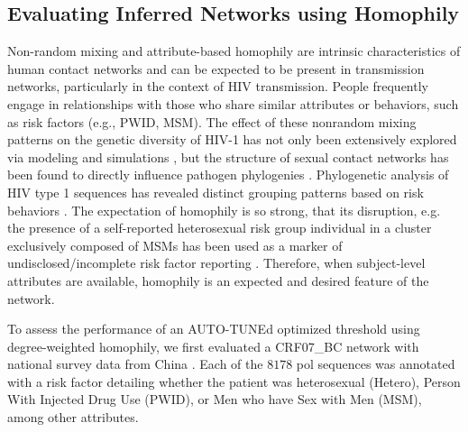 \documentclass[utf8]{FrontiersinHarvard} %
\begin{document}

\subsection{Evaluating Inferred Networks using Homophily}

Non-random mixing and attribute-based homophily are intrinsic characteristics
of human contact networks and can be expected to be present in transmission
networks, particularly in the context of HIV transmission. People frequently
engage in relationships with those who share similar attributes or behaviors,
such as risk factors (e.g., PWID, MSM). The effect of these nonrandom mixing
patterns on the genetic diversity of HIV-1 has not only been extensively
explored via modeling and simulations \citep{goodreau_assessing_2006}, but the
structure of sexual contact networks has been found to directly influence
pathogen phylogenies \citep{robinson_how_2013}. Phylogenetic analysis of HIV
type 1 sequences has revealed distinct grouping patterns based on risk
behaviors \citep{holmes_molecular_1995}. The expectation of homophily is so
strong, that its disruption, e.g. the presence of a self-reported heterosexual
risk group individual in a cluster exclusively composed of MSMs has been used
as a marker of undisclosed/incomplete risk factor reporting
\cite{Ragonnet-Cronin:2018aa}. Therefore, when subject-level attributes are
available, homophily is an expected and desired feature of the network.

To assess the performance of an AUTO-TUNEd optimized threshold using
degree-weighted homophily, we first evaluated a CRF07\_BC network with national
survey data from China \cite{Ge:2021aa} . Each of the $8178$ pol sequences was
annotated with a risk factor detailing whether the patient was heterosexual
(Hetero), Person With Injected Drug Use (PWID), or Men who have Sex with Men
(MSM), among other attributes.
\end{document}
